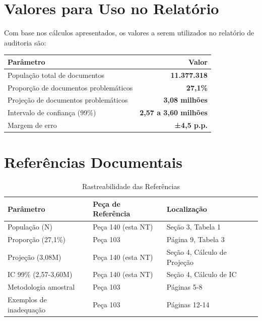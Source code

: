 \documentclass[11pt,a4paper]{article}
\begin{document}
\section{Valores para Uso no Relatório}

Com base nos cálculos apresentados, os valores a serem utilizados no relatório de auditoria são:

\begin{destaque}
\begin{center}
\renewcommand{\arraystretch}{1.5}
\begin{tabular}{|l|r|}
\hline
\rowcolor{tcublue!20}
\textbf{Parâmetro} & \textbf{Valor} \\
\hline
População total de documentos & \textbf{11.377.318} \\
\hline
Proporção de documentos problemáticos & \textbf{27,1\%} \\
\hline
Projeção de documentos problemáticos & \textbf{3,08 milhões} \\
\hline
Intervalo de confiança (99\%) & \textbf{2,57 a 3,60 milhões} \\
\hline
Margem de erro & \textbf{±4,5 p.p.} \\
\hline
\end{tabular}
\end{center}
\end{destaque}

\section{Referências Documentais}

\begin{table}[H]
\centering
\caption{Rastreabilidade das Referências}
\begin{tabular}{|p{3cm}|p{5cm}|p{6cm}|}
\hline
\rowcolor{tcublue!20}
\textbf{Parâmetro} & \textbf{Peça de Referência} & \textbf{Localização} \\
\hline
População (N) & Peça 140 (esta NT) & Seção 3, Tabela 1 \\
\hline
Proporção (27,1\%) & Peça 103 & Página 9, Tabela 3 \\
\hline
Projeção (3,08M) & Peça 140 (esta NT) & Seção 4, Cálculo de Projeção \\
\hline
IC 99\% (2,57-3,60M) & Peça 140 (esta NT) & Seção 4, Cálculo de IC \\
\hline
Metodologia amostral & Peça 103 & Páginas 5-8 \\
\hline
Exemplos de inadequação & Peça 103 & Páginas 12-14 \\
\hline
\end{tabular}
\end{table}
\end{document}
